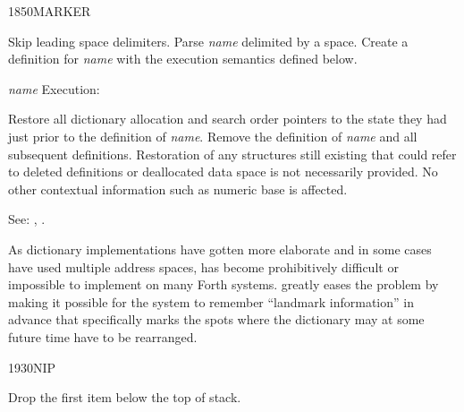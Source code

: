 \begin{newword}{1850}{MARKER}

	Skip leading space delimiters. Parse \emph{name} delimited by
	a space. Create a definition for \emph{name} with the execution
	semantics defined below.

\item[\emph{name} Execution:]
	\stack{}{}

	Restore all dictionary allocation and search order pointers to
	the state they had just prior to the definition of \emph{name}.
	Remove the definition of \emph{name} and all subsequent
	definitions. Restoration of any structures still existing that
	could refer to deleted definitions or deallocated data space is
	not necessarily provided. No other contextual information such
	as numeric base is affected.

\item[See:]
	,
	.

	\begin{rationale} %
		As dictionary implementations have gotten more elaborate
		and in some cases have used multiple address spaces,
		 has become prohibitively difficult or
		impossible to implement on many Forth systems. 
		greatly eases the problem by making it possible for the
		system to remember ``landmark information'' in advance that
		specifically marks the spots where the dictionary may at some
		future time have to be rearranged.
	\end{rationale}
\end{newword}


\begin{newword}{1930}{NIP}

	Drop the first item below the top of stack.
\end{newword}


